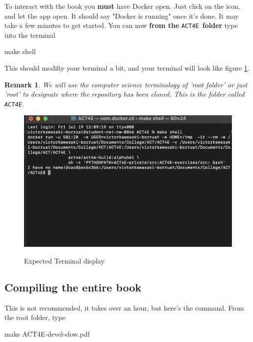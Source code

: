\documentclass{article}
\newtheorem{remark}{Remark}
\begin{document}
To interact with the book you \textbf{must} have Docker open. Just click on the icon, and let the app open. It should say "Docker is running" once it's done. It may take a few minutes to get started. You can now \textbf{from the} \texttt{ACT4E} \textbf{folder} type into the terminal
\begin{bashcode}
    make shell
\end{bashcode}
This should modifiy your terminal a bit, and your terminal will look like figure \ref{fig:enter-label}.
\begin{remark}
    We will use the computer science terminology of 'root folder' or just 'root' to designate where the repository has been cloned. This is the folder called \texttt{ACT4E}.
\end{remark}
\begin{figure}[ht]
    \centering
    \includegraphics[width=0.5\linewidth]{make-shell.png}
    \label{fig:enter-label}
    \caption{Expected Terminal display}
\end{figure}
\subsection{Compiling the entire book}
This is not recommended, it takes over an hour, but here's the command. From the root folder, type
\begin{bashcode}
    make ACT4E-devel-slow.pdf
\end{bashcode}
\end{document}
